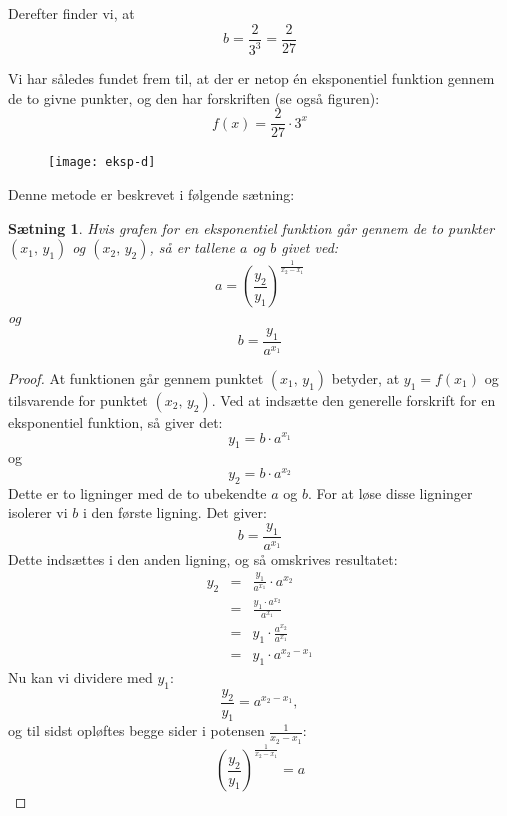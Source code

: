 \documentclass[12pt,oneside,a4paper]{article}
\newcommand{\bas}{\begin{eqnarray*}}
\newcommand{\eas}{\end{eqnarray*}}
\theoremstyle{plain}
\newtheorem*{thm}{Sætning}
\begin{document}
Derefter finder vi, at 
$$
b = \frac{2}{3^3} = \frac{2}{27}
$$

Vi har således fundet frem til, at der er netop én eksponentiel funktion gennem
de to givne punkter, og den har forskriften (se også figuren):
$$
f(x) = \frac{2}{27} \cdot 3^x
$$

\begin{figure}[ht]
    \centering
    \texttt{[image: eksp-d]}
    \label{eksp-d}
\end{figure}

Denne metode er beskrevet i følgende sætning:

\begin{thm}
    Hvis grafen for en eksponentiel funktion går gennem de to punkter $(x_1,
    \,y_1)$ og $(x_2, \,y_2)$, så er tallene $a$ og $b$ givet ved:
    $$
    a = \left(\frac{y_2}{y_1}\right)^{\frac{1}{x_2-x_1}}
    $$
    og
    $$
    b = \frac{y_1}{a^{x_1}}
    $$
\end{thm}
\begin{proof}
    At funktionen går gennem punktet $(x_1, \,y_1)$ betyder, at $y_1 = f(x_1)$
    og tilsvarende for punktet $(x_2,\,y_2)$. Ved at indsætte den generelle
    forskrift for en eksponentiel funktion, så giver det:
    $$
    y_1 = b\cdot a^{x_1}
    $$
    og 
    $$
    y_2 = b \cdot a^{x_2}
    $$
    Dette er to ligninger med de to ubekendte $a$ og $b$. For at løse disse ligninger
    isolerer vi $b$ i den første ligning. Det giver:
    $$
    b = \frac{y_1}{a^{x_1}}
    $$
    Dette indsættes i den anden ligning, og så omskrives resultatet:
    \bas
    y_2 &=& \frac{y_1}{a^{x_1}} \cdot a^{x_2} \\
    &=& \frac{y_1 \cdot a^{x_2}}{a^{x_1}} \\
    &=& y_1 \cdot \frac{a^{x_2}}{a^{x_1}} \\
    &=& y_1 \cdot a^{x_2-x_1}
    \eas
    Nu kan vi dividere med $y_1$:
    $$
    \frac{y_2}{y_1} = a^{x_2-x_1},
    $$
    og til sidst opløftes begge sider i potensen $\frac{1}{x_2-x_1}$:
    $$
    \left(\frac{y_2}{y_1}\right)^{\frac{1}{x_2-x_1}} = a
    $$
\end{proof}
\end{document}
